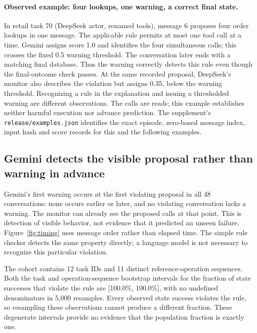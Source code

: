 \paragraph{Observed example: four lookups, one warning, a correct final state.}
In retail task 70 (DeepSeek actor, renamed tools), message 6 proposes four order lookups in one message. The applicable rule permits at most one tool call at a time. Gemini assigns score 1.0 and identifies the four simultaneous calls; this crosses the fixed 0.5 warning threshold. The conversation later ends with a matching final database. Thus the warning correctly detects this rule even though the final-outcome check passes. At the same recorded proposal, DeepSeek's monitor also describes the violation but assigns 0.35, below the warning threshold. Recognizing a rule in the explanation and issuing a thresholded warning are different observations. The calls are reads; this example establishes neither harmful execution nor advance prediction. The supplement's \texttt{release/examples.json} identifies the exact episode, zero-based message index, input hash and score records for this and the following examples.

\subsection{Gemini detects the visible proposal rather than warning in advance}
Gemini's first warning occurs at the first violating proposal in all 48 conversations: none occurs earlier or later, and no violating conversation lacks a warning. The monitor can already see the proposed calls at that point. This is detection of visible behavior, not evidence that it predicted an unseen failure. Figure~\ref{fig:timing} uses message order rather than elapsed time. The simple rule checker detects the same property directly; a language model is not necessary to recognize this particular violation.

The cohort contains 12 task IDs and 11 distinct reference-operation sequences. Both the task and operation-sequence bootstrap intervals for the fraction of state successes that violate the rule are [100.0\%, 100.0\%], with no undefined denominators in 5,000 resamples. Every observed state success violates the rule, so resampling these observations cannot produce a different fraction. These degenerate intervals provide no evidence that the population fraction is exactly one.


